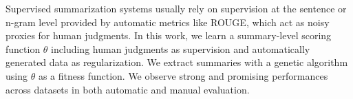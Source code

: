 Supervised summarization systems usually rely on supervision at the sentence or n-gram level provided by automatic metrics like ROUGE, which act as noisy proxies for human judgments. In this work, we learn a summary-level scoring function $\theta$ including human judgments as supervision and automatically generated data as regularization. We extract summaries with a genetic algorithm using $\theta$ as a fitness function. We observe strong and promising performances across datasets in both automatic and manual evaluation.
